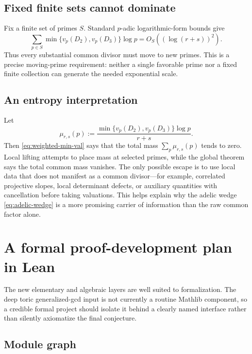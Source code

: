 \documentclass[11pt,oneside]{article}
\theoremstyle{definition}
\begin{document}
\subsection{Fixed finite sets cannot dominate}

Fix a finite set of primes $S$.  Standard $p$-adic logarithmic-form
bounds give
\begin{equation}\label{eq:fixed-S}
  \sum_{p\in S}\min\{v_p(D_2),v_p(D_3)\}\log p
  =O_S((\log(r+s))^2).
\end{equation}
Thus every substantial common divisor must move to new primes.  This is a
precise moving-prime requirement: neither a single favorable prime nor a
fixed finite collection can generate the needed exponential scale.

\subsection{An entropy interpretation}

Let
\begin{equation}\label{eq:common-measure}
  \mu_{r,s}(p)
  :=\frac{\min\{v_p(D_2),v_p(D_3)\}\log p}{r+s}.
\end{equation}
Then \eqref{eq:weighted-min-val} says that the total mass
$\sum_p\mu_{r,s}(p)$ tends to zero.  Local lifting attempts to place mass
at selected primes, while the global theorem says the total common mass
vanishes.  The only possible escape is to use local data that does not
manifest as a common divisor---for example, correlated projective slopes,
local determinant defects, or auxiliary quantities with cancellation
before taking valuations.  This helps explain why the adelic wedge
\eqref{eq:adelic-wedge} is a more promising carrier of information than
the raw common factor alone.

\section{A formal proof-development plan in Lean}\label{sec:lean}

The new elementary and algebraic layers are well suited to formalization.
The deep toric generalized-gcd input is not currently a routine Mathlib
component, so a credible formal project should isolate it behind a clearly
named interface rather than silently axiomatize the final conjecture.

\subsection{Module graph}
\end{document}
